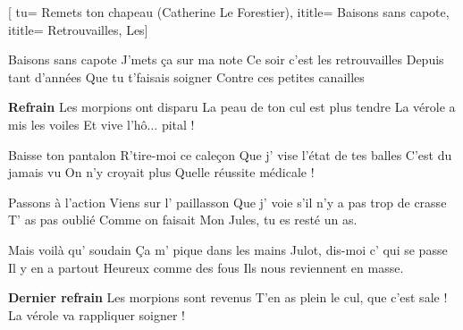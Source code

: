  [
tu= {Remets ton chapeau (Catherine Le Forestier)},
ititle= {Baisons sans capote},
ititle= {Retrouvailles, Les}]


\beginverse
Baisons sans capote
J'mets ça sur ma note
Ce soir c'est les retrouvailles
Depuis tant d'années
Que tu t'faisais soigner
Contre ces petites canailles
\endverse

\beginchorus
\textbf {Refrain}
Les morpions ont disparu
La peau de ton cul est plus tendre
La vérole a mis les voiles
Et vive l'hô... pital !
\endchorus

\beginverse
Baisse ton pantalon
R'tire-moi ce caleçon
Que j' vise l'état de tes balles
C'est du jamais vu
On n'y croyait plus
Quelle réussite médicale !
\endverse

\beginverse
Passons à l'action
Viens sur l' paillasson
Que j' voie s'il n'y a pas trop de crasse
T' as pas oublié
Comme on faisait
Mon Jules, tu es resté un as.
\endverse

\beginverse
Mais voilà qu' soudain
Ça m' pique dans les mains
Julot, dis-moi c' qui se passe
Il y en a partout
Heureux comme des fous
Ils nous reviennent en masse.
\endverse

\beginchorus
\textbf {Dernier refrain}
Les morpions sont revenus
T'en as plein le cul, que c'est sale !
La vérole va rappliquer
 soigner !
\endchorus

\endsong